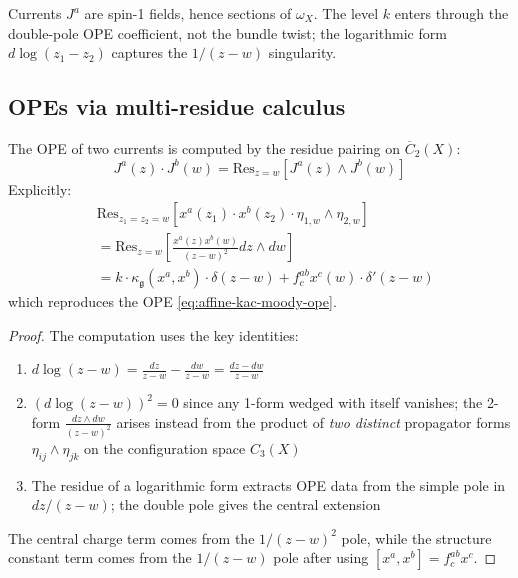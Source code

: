 \begin{remark}
Currents $J^a$ are spin-1 fields, hence sections of $\omega_X$.  The level $k$ enters through the double-pole OPE coefficient, not the bundle twist; the logarithmic form $d\log(z_1-z_2)$ captures the $1/(z-w)$ singularity.
\end{remark}

\subsection{OPEs via multi-residue calculus}

\begin{theorem}\label{thm:geometric-ope-kac-moody}
The OPE of two currents is computed by the residue pairing on $\overline{C}_2(X)$:
\begin{equation}
J^a(z) \cdot J^b(w) = \mathrm{Res}_{z=w}\left[J^a(z) \wedge J^b(w)\right]
\end{equation}
Explicitly:
\begin{align}
&\mathrm{Res}_{z_1 = z_2 = w}\left[x^a(z_1) \cdot x^b(z_2) \cdot \eta_{1,w} \wedge \eta_{2,w}\right] \\
&= \mathrm{Res}_{z=w}\left[\frac{x^a(z) x^b(w)}{(z-w)^2} dz \wedge dw\right] \\
&= k \cdot \kappa_{\mathfrak{g}}(x^a,x^b) \cdot \delta(z-w) + f^{ab}_c x^c(w) \cdot \delta'(z-w)
\end{align}
which reproduces the OPE \eqref{eq:affine-kac-moody-ope}.
\end{theorem}

\begin{proof}
The computation uses the key identities:
\begin{enumerate}
\item $d\log(z-w) = \frac{dz}{z-w} - \frac{dw}{z-w} = \frac{dz-dw}{z-w}$
\item $(d\log(z-w))^2 = 0$ since any 1-form wedged with itself vanishes; the 2-form
$\frac{dz \wedge dw}{(z-w)^2}$ arises instead from the product of \emph{two distinct}
propagator forms $\eta_{ij} \wedge \eta_{jk}$ on the configuration space $C_3(X)$
\item The residue of a logarithmic form extracts OPE data from the
simple pole in $dz/(z-w)$; the double pole gives the central extension
\end{enumerate}
The central charge term comes from the $1/(z-w)^2$ pole, while the structure constant term comes from the $1/(z-w)$ pole after using $[x^a, x^b] = f^{ab}_c x^c$.
\end{proof}

